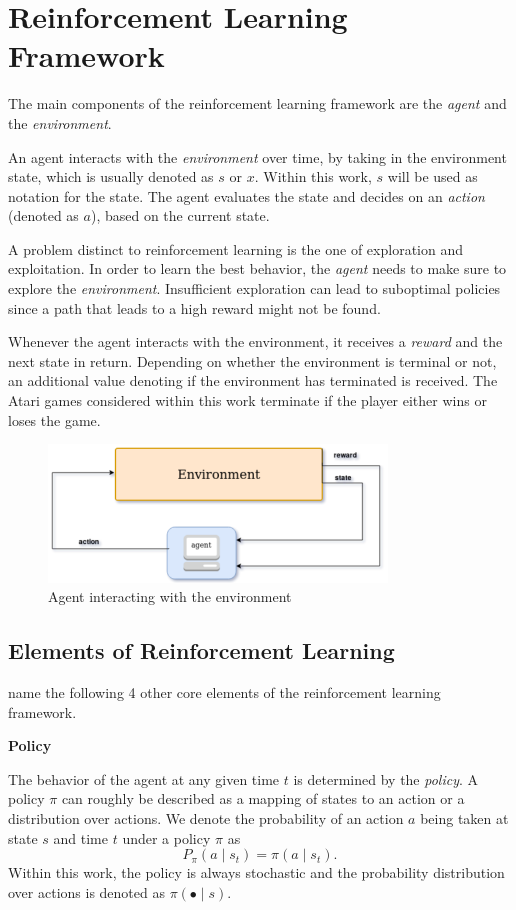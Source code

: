 \section{Reinforcement Learning Framework}\raggedbottom 
The main components of the reinforcement learning framework are the \textit{agent} and the \textit{environment}.

An agent interacts with the \textit{environment} over time, by taking in the environment state, which is usually denoted as $s$ or $x$. Within this work, $s$ will be used as notation for the state.
The agent evaluates the state and decides on an \textit{action} (denoted as $a$), based on the current state. 

A problem distinct to reinforcement learning is the one of exploration and exploitation. In order to learn the best behavior, the \textit{agent} needs to make sure to explore the \textit{environment}. Insufficient exploration can lead to suboptimal policies since a path that leads to a high reward might not be found. 

Whenever the agent interacts with the environment, it receives a \textit{reward} and the next state in return.
Depending on whether the environment is terminal or not, an additional value denoting if the environment has terminated is received. 
The Atari games considered within this work terminate if the player either wins or loses the game.

\begin{figure}
\includegraphics[width=90mm]{bilder/RLFramework.png}
\caption{Agent interacting with the environment}
\end{figure}


\subsection{Elements of Reinforcement Learning}
\citet{Sut98} name the following 4 other core elements of the reinforcement learning framework.

\textbf{Policy}

The behavior of the agent at any given time $t$ is determined by the \textit{policy}. A policy $\pi$ can roughly be described as a mapping of states to an action or a distribution over actions. 
We denote the probability of an action $a$ being taken at state $s$ and time $t$ under a policy $\pi$ as
\begin{equation}
P_\pi( a \mid s_t) = \pi(a \mid s_t) . 
\end{equation}
Within this work, the policy is always stochastic and the probability distribution over actions is denoted as $\pi (\bullet \mid s)$.
\pagebreak

